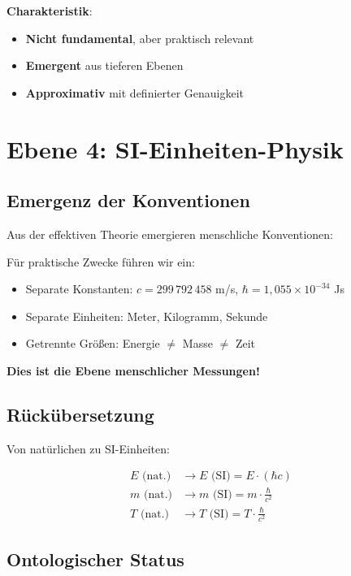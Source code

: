 \textbf{Charakteristik}:
\begin{itemize}
\item \textbf{Nicht fundamental}, aber praktisch relevant
\item \textbf{Emergent} aus tieferen Ebenen
\item \textbf{Approximativ} mit definierter Genauigkeit
\end{itemize}

\section{Ebene 4: SI-Einheiten-Physik}

\subsection{Emergenz der Konventionen}

Aus der effektiven Theorie emergieren menschliche Konventionen:

\begin{keyresult}
Für praktische Zwecke führen wir ein:

\begin{itemize}
\item Separate Konstanten: $c = 299\,792\,458$ m/s, $\hbar = 1{,}055 \times 10^{-34}$ Js
\item Separate Einheiten: Meter, Kilogramm, Sekunde
\item Getrennte Größen: Energie $\neq$ Masse $\neq$ Zeit
\end{itemize}

\textbf{Dies ist die Ebene menschlicher Messungen!}
\end{keyresult}

\subsection{Rückübersetzung}

Von natürlichen zu SI-Einheiten:

\begin{align}
E \text{ (nat.)} &\to E \text{ (SI)} = E \cdot (\hbar c) \\
m \text{ (nat.)} &\to m \text{ (SI)} = m \cdot \frac{\hbar}{c^2} \\
T \text{ (nat.)} &\to T \text{ (SI)} = T \cdot \frac{\hbar}{c^2}
\end{align}

\subsection{Ontologischer Status}

